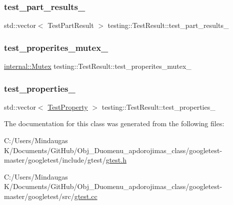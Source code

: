 \subsubsection{\texorpdfstring{test\_part\_results\_}{test\_part\_results\_}}
{\footnotesize\ttfamily std\+::vector$<$ Test\+Part\+Result $>$ testing\+::\+Test\+Result\+::test\+\_\+part\+\_\+results\+\_\+\hspace{0.3cm}{\ttfamily [private]}}

\mbox{\label{classtesting_1_1_test_result_a58d7d97bd16a04b932e2863153c13dff}} 
\subsubsection{\texorpdfstring{test\_properites\_mutex\_}{test\_properites\_mutex\_}}
{\footnotesize\ttfamily \mbox{\hyperlink{classtesting_1_1internal_1_1_mutex}{internal\+::\+Mutex}} testing\+::\+Test\+Result\+::test\+\_\+properites\+\_\+mutex\+\_\+\hspace{0.3cm}{\ttfamily [private]}}

\mbox{\label{classtesting_1_1_test_result_a28b5431b388a34e0308e7c1392b4dee3}} 
\subsubsection{\texorpdfstring{test\_properties\_}{test\_properties\_}}
{\footnotesize\ttfamily std\+::vector$<$ \mbox{\hyperlink{classtesting_1_1_test_property}{Test\+Property}} $>$ testing\+::\+Test\+Result\+::test\+\_\+properties\+\_\+\hspace{0.3cm}{\ttfamily [private]}}



The documentation for this class was generated from the following files\+:\begin{DoxyCompactItemize}
\item 
C\+:/\+Users/\+Mindaugas K/\+Documents/\+Git\+Hub/\+Obj\+\_\+\+Duomenu\+\_\+apdorojimas\+\_\+class/googletest-\/master/googletest/include/gtest/\mbox{\hyperlink{googletest-master_2googletest_2include_2gtest_2gtest_8h}{gtest.\+h}}\item 
C\+:/\+Users/\+Mindaugas K/\+Documents/\+Git\+Hub/\+Obj\+\_\+\+Duomenu\+\_\+apdorojimas\+\_\+class/googletest-\/master/googletest/src/\mbox{\hyperlink{googletest-master_2googletest_2src_2gtest_8cc}{gtest.\+cc}}\end{DoxyCompactItemize}
